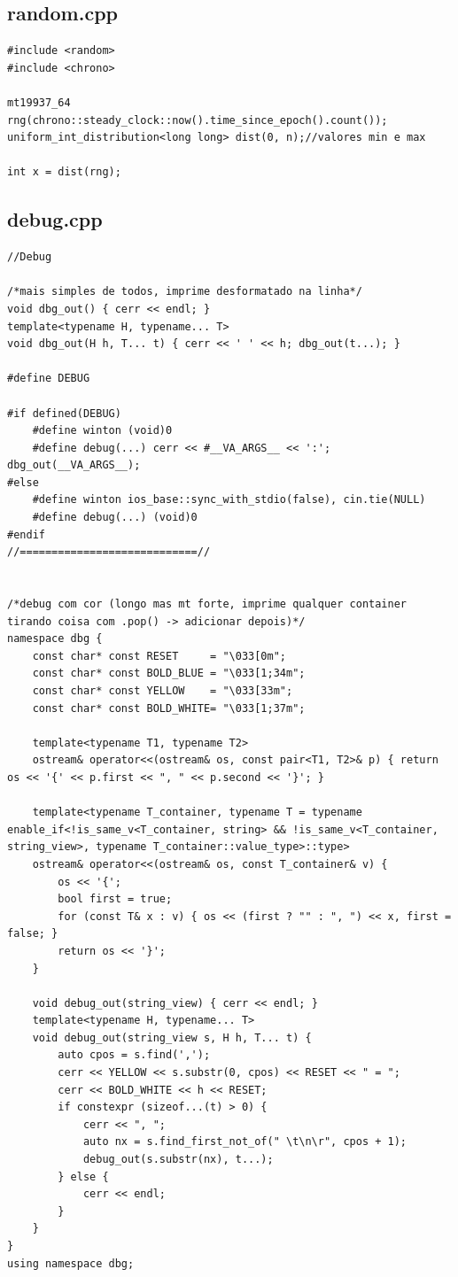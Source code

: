 \documentclass[11pt, a4paper, twoside]{article}
\begin{document}
{{\subsection{random.cpp}
\begin{lstlisting}
#include <random>
#include <chrono>

mt19937_64 rng(chrono::steady_clock::now().time_since_epoch().count());
uniform_int_distribution<long long> dist(0, n);//valores min e max

int x = dist(rng);
\end{lstlisting}

\subsection{debug.cpp}
\begin{lstlisting}
//Debug

/*mais simples de todos, imprime desformatado na linha*/
void dbg_out() { cerr << endl; }
template<typename H, typename... T> 
void dbg_out(H h, T... t) { cerr << ' ' << h; dbg_out(t...); }

#define DEBUG

#if defined(DEBUG)
    #define winton (void)0
    #define debug(...) cerr << #__VA_ARGS__ << ':'; dbg_out(__VA_ARGS__);
#else
    #define winton ios_base::sync_with_stdio(false), cin.tie(NULL)
    #define debug(...) (void)0
#endif
//============================//


/*debug com cor (longo mas mt forte, imprime qualquer container tirando coisa com .pop() -> adicionar depois)*/
namespace dbg {
    const char* const RESET     = "\033[0m";
    const char* const BOLD_BLUE = "\033[1;34m";
    const char* const YELLOW    = "\033[33m";
    const char* const BOLD_WHITE= "\033[1;37m";

    template<typename T1, typename T2>
    ostream& operator<<(ostream& os, const pair<T1, T2>& p) { return os << '{' << p.first << ", " << p.second << '}'; }

    template<typename T_container, typename T = typename enable_if<!is_same_v<T_container, string> && !is_same_v<T_container, string_view>, typename T_container::value_type>::type>
    ostream& operator<<(ostream& os, const T_container& v) {
        os << '{';
        bool first = true;
        for (const T& x : v) { os << (first ? "" : ", ") << x, first = false; }
        return os << '}';
    }

    void debug_out(string_view) { cerr << endl; }
    template<typename H, typename... T>
    void debug_out(string_view s, H h, T... t) {
        auto cpos = s.find(',');
        cerr << YELLOW << s.substr(0, cpos) << RESET << " = ";
        cerr << BOLD_WHITE << h << RESET;
        if constexpr (sizeof...(t) > 0) {
            cerr << ", ";
            auto nx = s.find_first_not_of(" \t\n\r", cpos + 1);
            debug_out(s.substr(nx), t...);
        } else {
            cerr << endl;
        }
    }
} 
using namespace dbg;


\end{lstlisting}}}
\end{document}
